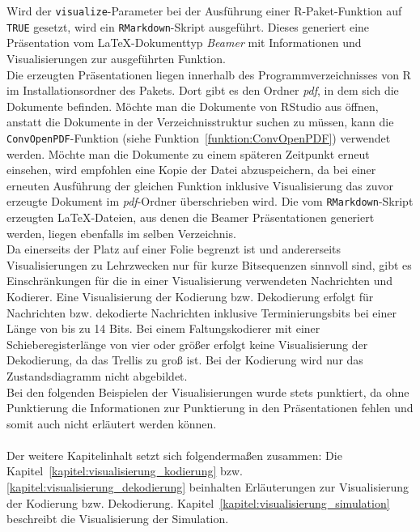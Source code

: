 Wird der \texttt{visualize}-Parameter bei der Ausführung einer R-Paket-Funktion auf \texttt{TRUE} gesetzt, wird ein \texttt{RMarkdown}-Skript ausgeführt. Dieses generiert eine  Präsentation vom \LaTeX -Dokumenttyp \emph{Beamer} mit Informationen und Visualisierungen zur ausgeführten Funktion.
\\
Die erzeugten Präsentationen liegen innerhalb des Programmverzeichnisses von R im Installationsordner des Pakets. Dort gibt es den Ordner \emph{pdf}, in dem sich die Dokumente befinden. Möchte man die Dokumente von RStudio aus öffnen, anstatt die Dokumente in der Verzeichnisstruktur suchen zu müssen, kann die \texttt{ConvOpenPDF}-Funktion (siehe Funktion~\ref{funktion:ConvOpenPDF}) verwendet werden. Möchte man die Dokumente zu einem späteren Zeitpunkt erneut einsehen, wird empfohlen eine Kopie der Datei abzuspeichern, da bei einer erneuten Ausführung der gleichen Funktion inklusive Visualisierung das zuvor erzeugte Dokument im \emph{pdf}-Ordner überschrieben wird. Die vom \texttt{RMarkdown}-Skript erzeugten \LaTeX -Dateien, aus denen die Beamer Präsentationen generiert werden, liegen ebenfalls im selben Verzeichnis.
\\
Da einerseits der Platz auf einer Folie begrenzt ist und andererseits Visualisierungen zu Lehrzwecken nur für kurze Bitsequenzen sinnvoll sind, gibt es Einschränkungen für die in einer Visualisierung verwendeten Nachrichten und Kodierer. Eine Visualisierung der Kodierung bzw. Dekodierung erfolgt für Nachrichten bzw. dekodierte Nachrichten inklusive Terminierungsbits bei einer Länge von bis zu 14 Bits. Bei einem Faltungskodierer mit einer Schieberegisterlänge von vier oder größer erfolgt keine Visualisierung der Dekodierung, da das Trellis zu groß ist. Bei der Kodierung wird nur das Zustandsdiagramm nicht abgebildet.
\\
Bei den folgenden Beispielen der Visualisierungen wurde stets punktiert, da ohne Punktierung die Informationen zur Punktierung in den Präsentationen fehlen und somit auch nicht erläutert werden können.
\\
\\
Der weitere Kapitelinhalt setzt sich folgendermaßen zusammen: Die Kapitel~\ref{kapitel:visualisierung_kodierung} bzw. \ref{kapitel:visualisierung_dekodierung} beinhalten Erläuterungen zur Visualisierung der Kodierung bzw. Dekodierung. Kapitel~\ref{kapitel:visualisierung_simulation} beschreibt die Visualisierung der Simulation.
